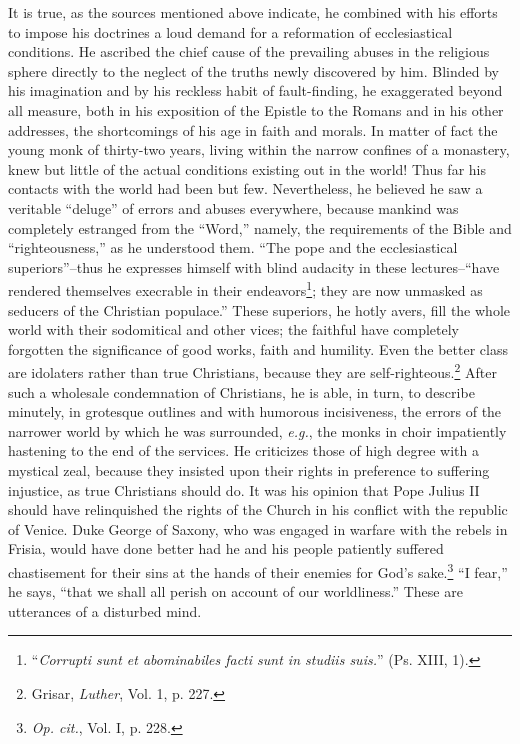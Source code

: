 It is true, as the sources mentioned above indicate, he combined
with his efforts to impose his doctrines a loud demand for a reformation
of ecclesiastical conditions. He ascribed the chief cause
of the prevailing abuses in the religious sphere directly to the neglect
of the truths newly discovered by him. Blinded by his imagination
and by his reckless habit of fault-finding, he exaggerated beyond
all measure, both in his exposition of the Epistle to the Romans and
in his other addresses, the shortcomings of his age in faith and morals.
In matter of fact the young monk of thirty-two years, living within
the narrow confines of a monastery, knew but little of the actual
conditions existing out in the world! Thus far his contacts with
the world had been but few. Nevertheless, he believed he saw a
veritable “deluge” of errors and abuses everywhere, because mankind
was completely estranged from the “Word,” namely, the requirements
of the Bible and “righteousness,” as he understood them.
“The pope and the ecclesiastical superiors”--thus he expresses himself
with blind audacity in these lectures--``have rendered themselves execrable
in their endeavors\footnote{“\textit{Corrupti sunt et abominabiles facti sunt in studiis suis.}” (Ps. XIII, 1).};
they are now unmasked as seducers of the Christian populace.'' These superiors, he hotly avers,
fill the whole world with their sodomitical and other vices; the faithful
have completely forgotten the significance of good works, faith
and humility. Even the better class are idolaters rather than true
Christians, because they are self-righteous.\footnote{Grisar, \textit{Luther}, Vol. 1, p. 227.}
After such a wholesale condemnation of Christians, he is able, in turn, to describe
minutely, in grotesque outlines and with humorous incisiveness, the
errors of the narrower world by which he was surrounded, \textit{e.g.},
the monks in choir impatiently hastening to the end of the services.
He criticizes those of high degree with a mystical zeal, because they
insisted upon their rights in preference to suffering injustice, as
true Christians should do. It was his opinion that Pope Julius II
should have relinquished the rights of the Church in his conflict
with the republic of Venice. Duke George of Saxony, who was engaged in
warfare with the rebels in Frisia, would have done better
had he and his people patiently suffered chastisement for their sins
at the hands of their enemies for God’s sake.\footnote{\textit{Op. cit.}, Vol. I, p. 228.}
“I fear,” he says,
“that we shall all perish on account of our worldliness.” These are
utterances of a disturbed mind.

